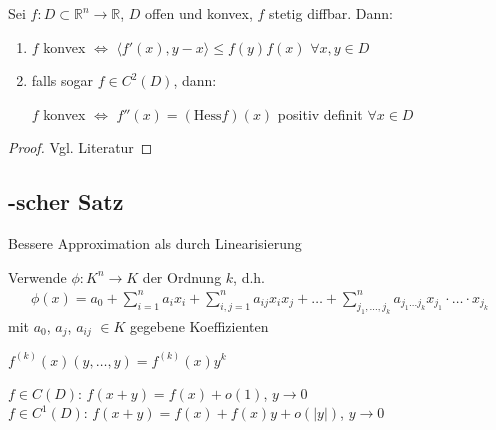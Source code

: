 \begin{proposition}
	Sei $f:D\subset\mathbb{R}^n\to\mathbb{R}$, $D$ offen und konvex, $f$ stetig \gls{diffbar}. Dann:\begin{enumerate}[label={\alph*)}]
		\item $f$ konvex $\Leftrightarrow$ $\langle f'(x), y- x\rangle \le f(y)f(x)$ $\forall x,y\in D$
		\item falls sogar $f\in C^2(D)$, dann: \begin{center}
				$f$ konvex $\Leftrightarrow$ $f''(x) = (\mathrm{Hess} f)(x)$ positiv definit $\forall x\in D$
		\end{center}
	\end{enumerate}
\end{proposition}
\begin{proof}
	Vgl. Literatur
\end{proof}

\subsection{-scher Satz}
\begin{boldenvironment}[Ziel]
	Bessere Approximation als durch Linearisierung
\end{boldenvironment}

Verwende  $\phi:K^n\to K$ der Ordnung $k$, d.h. \begin{align}
	\phi(x) = a_0 + \sum_{i=1}^n a_i x_i + \sum_{i,j=1}^n a_{ij} x_i x_j + \dotsc + \sum_{j_1,\dotsc,j_k}^n a_{j_1\dots j_k} x_{j_1}\cdot\dots\cdot x_{j_k}
\end{align}
mit $a_0$, $a_j$, $a_{ij}$ $\in K$ gegebene Koeffizienten

\begin{boldenvironment}[Notation]
	 $f^{(k)}(x)(y,\dotsc,y) = f^{(k)}(x) y^k$
\end{boldenvironment}

\begin{boldenvironment}[Wiederholung]
	$f\in C(D)$: $f(x+y) = f(x) + o(1)$, $y\to 0$ \\
	$f\in C^1(D)$: $f(x+y) = f(x) + f(x)y + o(\vert y \vert)$, $y\to 0$
\end{boldenvironment}

